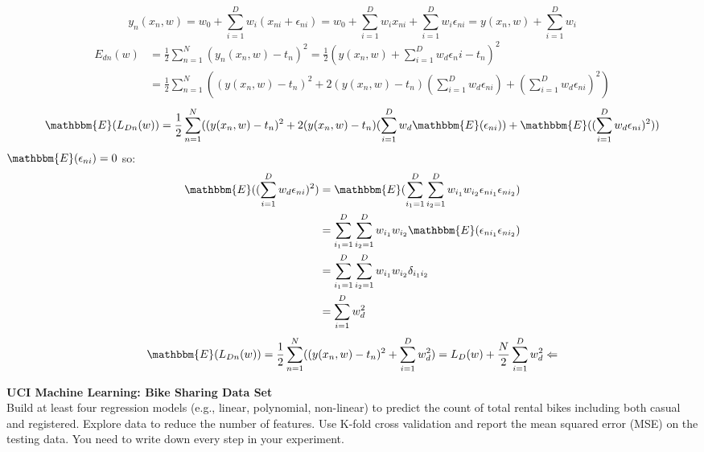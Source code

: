 \documentclass{homework}
\begin{document}
\begin{solution}
    \begin{equation*}
        y_n(x_n, w) = w_0 + \sum_{i=1}^D w_i(x_{ni}+\epsilon_{ni}) = w_0 + \sum_{i=1}^D w_i x_{ni}+\sum_{i=1}^D w_i \epsilon_{ni} = y(x_n, w) + \sum_{i=1}^D w_i
    \end{equation*}
    \begin{equation*}
        \begin{split}
    E_{dn}(w) & = \frac{1}{2} \sum_{n=1}^{N} (y_n(x_n, w) - t_n)^2 = \frac{1}{2} (y(x_n, w) + \sum_{i=1}^{D} w_d \epsilon_ni -t_n )^2 \\
            & = \frac{1}{2} \sum_{n=1}^{N} ((y(x_n, w) - t_n)^2 + 2(y(x_n, w) - t_n)(\sum_{i=1}^{D} w_d \epsilon_{ni})+ (\sum_{i=1}^D w_d \epsilon_{ni})^2) 
        \end{split}
    \end{equation*}
    \begin{equation*}
        \mathbbm{E}(L_{Dn}(w)) = \frac{1}{2} \sum_{n=1}^{N} ( (y(x_n, w) -t_n)^2 + 2(y(x_n, w) - t_n)(\sum_{i=1}^D w_d \mathbbm{E}(\epsilon_{ni})) + \mathbbm{E}((\sum_{i=1}^{D} w_d \epsilon_{ni})^2))
    \end{equation*}
    $\mathbbm{E}(\epsilon_{ni}) = 0$ so: 
    \begin{equation*}
        \begin{split}
            \mathbbm{E}((\sum_{i=1}^D w_d \epsilon_{ni})^2) & = \mathbbm{E}(\sum_{i_1=1}^D \sum_{i_2=1}^D w_{i_1} w_{i_2} \epsilon_{ni_1} \epsilon_{ni_2}) \\
            & = \sum_{i_1=1}^D \sum_{i_2=1}^D w_{i_1} w_{i_2} \mathbbm{E}(\epsilon_{ni_1} \epsilon_{ni_2}) \\
            & = \sum_{i_1=1}^D \sum_{i_2=1}^D w_{i_1} w_{i_2} \delta_{i_1 i_2} \\
            & = \sum_{i=1}^D w_d^2 \\
        \end{split}
    \end{equation*}
    \begin{equation*}
        \mathbbm{E}(L_{Dn}(w)) = \frac{1}{2} \sum_{n=1}^{N} ((y(x_n, w) - t_n)^2 + \sum_{i=1}^D w_d^2) = L_D(w) + \frac{N}{2} \sum_{i=1}^D w_d^2 \Leftarrow
    \end{equation*}

\newpage
\begin{problem}[4]
    \textbf{UCI Machine Learning: Bike Sharing Data Set}\\
    Build at least four regression models (e.g., linear, polynomial, non-linear) to predict the count of total rental bikes including both casual and registered. Explore data to reduce the number of features. Use K-fold cross validation and report the mean squared error (MSE) on the testing data. You need to write down every step in your experiment.
\end{problem}


\end{solution}
\end{document}

